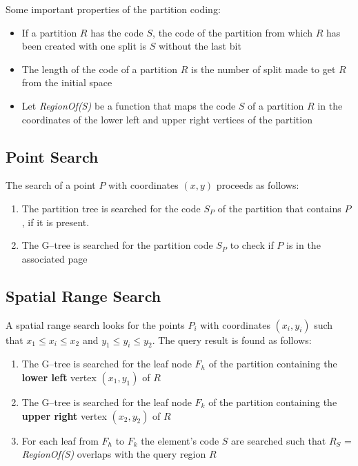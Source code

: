 Some important properties of the partition coding:
\begin{itemize}
    \item If a partition $R$ has the code $S$, the code of the partition from which $R$ has been created with one split is $S$ without the last bit
    \item The length of the code of a partition $R$ is the number of split made to get $R$ from the initial space
    \item Let \textit{RegionOf(S)} be a function that maps the code $S$ of a partition $R$ in the coordinates of the lower left and upper right vertices of the partition
\end{itemize}

\subsection{Point Search}
The search of a point $P$ with coordinates $(x, y)$ proceeds as follows:
\begin{enumerate}
    \item The partition tree is searched for the code $S_P$ of the partition that contains $P$, if it is present.
    \item The G–tree is searched for the partition code $S_P$ to check if $P$ is in the associated page
\end{enumerate}

\subsection{Spatial Range Search}
A spatial range search looks for the points $P_i$ with coordinates $(x_i, y_i)$ such that $x_1 \leq x_i \leq x_2$ and $y_1 \leq y_i \leq y_2$. The query result is found as follows:
\begin{enumerate}
    \item The G–tree is searched for the leaf node $F_h$ of the partition containing the \textbf{lower left} vertex $(x_1, y_1)$ of $R$
    \item The G–tree is searched for the leaf node $F_k$ of the partition containing the \textbf{upper right} vertex $(x_2, y_2)$ of $R$
    \item For each leaf from $F_h$ to $F_k$ the element's code $S$ are searched such that $R_S$ = \textit{RegionOf(S)} overlaps with the query region $R$
\end{enumerate}

